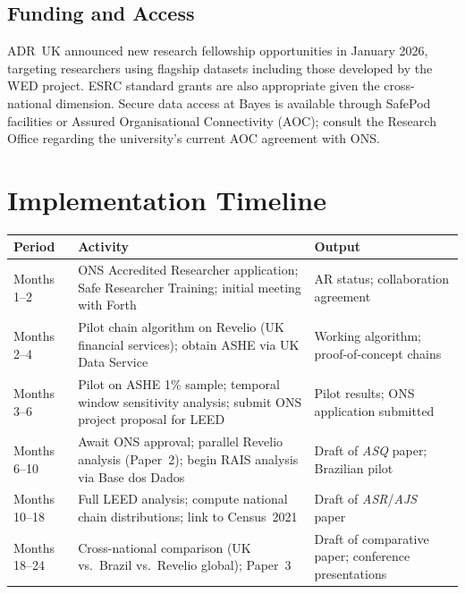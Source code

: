 \documentclass[a4paper]{tufte-handout}
\begin{document}
\subsection{Funding and Access}

ADR~UK announced new research fellowship opportunities in January 2026, targeting researchers using flagship datasets including those developed by the WED project. ESRC standard grants are also appropriate given the cross-national dimension. Secure data access at Bayes is available through SafePod facilities or Assured Organisational Connectivity (AOC); consult the Research Office regarding the university's current AOC agreement with ONS\@.


\section{Implementation Timeline}

\begin{fullwidth}
	\smallskip
	\small
	\begin{tabularx}{\linewidth}{@{}l X X@{}}
		\toprule
		\textbf{Period} & \textbf{Activity}                                                                                    & \textbf{Output}                                      \\
		\midrule
		Months 1--2     & ONS Accredited Researcher application; Safe Researcher Training; initial meeting with Forth          & AR status; collaboration agreement                   \\[4pt]
		Months 2--4     & Pilot chain algorithm on Revelio (UK financial services); obtain ASHE via UK Data Service            & Working algorithm; proof-of-concept chains           \\[4pt]
		Months 3--6     & Pilot on ASHE 1\% sample; temporal window sensitivity analysis; submit ONS project proposal for LEED & Pilot results; ONS application submitted             \\[4pt]
		Months 6--10    & Await ONS approval; parallel Revelio analysis (Paper~2); begin RAIS analysis via Base dos Dados      & Draft of \emph{ASQ} paper; Brazilian pilot           \\[4pt]
		Months 10--18   & Full LEED analysis; compute national chain distributions; link to Census~2021                        & Draft of \emph{ASR}/\emph{AJS} paper                 \\[4pt]
		Months 18--24   & Cross-national comparison (UK vs.\ Brazil vs.\ Revelio global); Paper~3                              & Draft of comparative paper; conference presentations \\
		\bottomrule
	\end{tabularx}
	\smallskip
\end{fullwidth}
\end{document}
